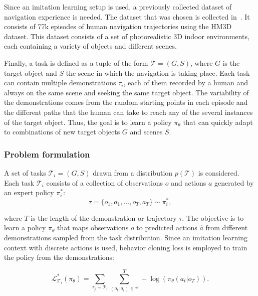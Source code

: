 Since an imitation learning setup is used, a previously collected dataset of navigation experience is needed.
The dataset that was chosen is collected in~\cite{ramrakhya2023}.
It consists of 77k episodes of human navigation trajectories using the HM3D~\cite{Ramakrishnan2021HabitatMatterport3D} dataset.
This dataset consists of a set of photorealistic 3D indoor environments, each containing a variety of objects and different scenes.

Finally, a task is defined as a tuple of the form $\mathcal{T} = (G, S)$, where $G$ is the target object and $S$ the scene in which the navigation is taking place.
Each task can contain multiple demonstrations $\tau_i$, each of them recorded by a human and always on the same scene and seeking the same target object.
The variability of the demonstrations comes from the random starting points in each episode and the different paths that the human can take to reach any of the several instances of the target object.
Thus, the goal is to learn a policy $\pi_\theta$ that can quickly adapt to combinations of new target objects $G$ and scenes $S$.

\subsubsection{Problem formulation}\label{subsubsec:problem-formulation}

A set of tasks $\mathcal{T}_i = (G, S)$ drawn from a distribution $p(\mathcal{T})$ is considered.
Each task $\mathcal{T}_i$ consists of a collection of observations $o$ and actions $a$ generated by an expert policy $\pi^*_i$:
\begin{equation}
    \tau = \{o_1, a_1, \dots, o_T, a_T\} \sim \pi^*_i,\label{eq:equation}
\end{equation}

where $T$ is the length of the demonstration or trajectory $\tau$.
The objective is to learn a policy $\pi_\theta$ that maps observations $o$ to predicted actions $\hat{a}$ from different demonstrations sampled from the task distribution.
Since an imitation learning context with discrete actions is used, behavior cloning loss is employed to train the policy from the demonstrations:

\begin{equation}
    \mathcal{L}^*_{\mathcal{T}_i}(\pi_\theta) = \sum_{\tau_j \sim \mathcal{T}_i} \sum_{(o_t, a_t) \in \tau^i}^T -\log (\pi_\theta(a_t|o_T)).
    \label{eq:loss_metanav}
\end{equation}

